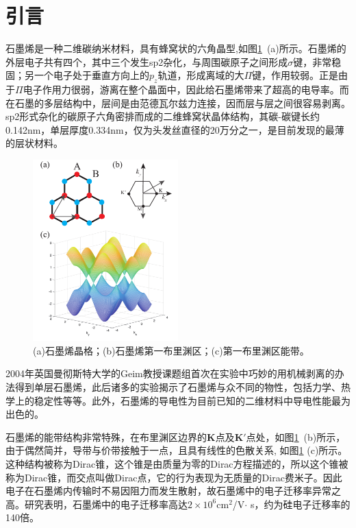 	\section{引言}\label{sec:intro}
    石墨烯是一种二维碳纳米材料，具有蜂窝状的六角晶型,如图\ref{fig:graphene}~(a)所示。石墨烯的外层电子共有四个，其中三个发生sp2杂化，与周围碳原子之间形成$\sigma$键，非常稳固；另一个电子处于垂直方向上的$p_z$轨道，形成离域的大$\Pi$键，作用较弱。正是由于$\Pi$电子作用力很弱，游离在整个晶面中，因此给石墨烯带来了超高的电导率。而在石墨的多层结构中，层间是由范德瓦尔兹力连接，因而层与层之间很容易剥离。sp2形式杂化的碳原子六角密排而成的二维蜂窝状晶体结构，其碳-碳键长约0.142nm，单层厚度0.334nm，仅为头发丝直径的20万分之一，是目前发现的最薄的层状材料。
    \begin{figure}
      \centering
      \includegraphics[width=0.5\textwidth]{pic/fig0.pdf}
      \caption{(a)石墨烯晶格；(b)石墨烯第一布里渊区；(c)第一布里渊区能带。}\label{fig:graphene}
    \end{figure}
    2004年英国曼彻斯特大学的Geim教授课题组首次在实验中巧妙的用机械剥离的办法得到单层石墨烯，此后诸多的实验揭示了石墨烯与众不同的物性\cite{novoselov2005two,novoselov2007rise,Castro2009}，包括力学、热学上的稳定性等等。此外，石墨烯的导电性为目前已知的二维材料中导电性能最为出色的。
	
    石墨烯的能带结构非常特殊，在布里渊区边界的$\mathbf{K}$点及$\mathbf{K}'$点处，如图\ref{fig:graphene}~(b)所示，由于偶然简并，导带与价带接触于一点，且具有线性的色散关系, 如图\ref{fig:graphene} (c)所示。这种结构被称为Dirac锥，这个锥是由质量为零的Dirac方程描述的，所以这个锥被称为Dirac锥，而交点叫做Dirac点，它的行为表现为无质量的Dirac费米子。因此电子在石墨烯内传输时不易因阻力而发生散射，故石墨烯中的电子迁移率异常之高。研究表明，石墨烯中的电子迁移率高达$2\times 10^6 $cm$^2$/V$\cdot$ s，约为硅电子迁移率的140倍\cite{Castro2009,Kane2005,Kane2005_1}。

